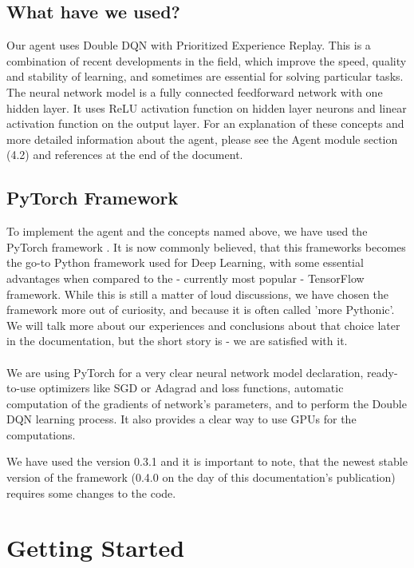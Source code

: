 \documentclass{article}
\begin{document}
\subsection{What have we used?}
Our agent uses Double DQN with Prioritized Experience Replay. This is a combination of recent developments in the field, which improve the speed, quality and stability of learning, and sometimes are essential for solving particular tasks. The neural network model is a fully connected feedforward network with one hidden layer. It uses ReLU activation function on hidden layer neurons and linear activation function on the output layer. For an explanation of these concepts and more detailed information about the agent, please see the Agent module section (4.2) and references at the end of the document.
\subsection{PyTorch Framework}
To implement the agent and the concepts named above, we have used the PyTorch framework \cite{pytorch}. It is now commonly believed, that this frameworks becomes the go-to Python framework used for Deep Learning, with some essential advantages when compared to the - currently most popular - TensorFlow framework. While this is still a matter of loud discussions, we have chosen the framework more out of curiosity, and because it is often called 'more Pythonic'. We will talk more about our experiences and conclusions about that choice later in the documentation, but the short story is - we are satisfied with it.
\\\\
We are using PyTorch for a very clear neural network model declaration, ready-to-use optimizers like SGD or Adagrad and loss functions, automatic computation of the gradients of network's parameters, and to perform the Double DQN learning process. It also provides a clear way to use GPUs for the computations. 

We have used the version 0.3.1 and it is important to note, that the newest stable version of the framework (0.4.0 on the day of this documentation's publication) requires some changes to the code.
\section{Getting Started}
\end{document}
